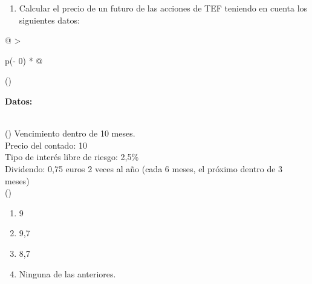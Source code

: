 \documentclass[
  letterpaper,
  DIV=11,
  numbers=noendperiod]{scrreprt}
\providecommand{\tightlist}{%
  \setlength{\itemsep}{0pt}\setlength{\parskip}{0pt}}\usepackage{longtable,booktabs,array}
\begin{document}
\begin{enumerate}
\def\labelenumi{\arabic{enumi}.}
\setcounter{enumi}{57}
\tightlist
\item
  Calcular el precio de un futuro de las acciones de TEF teniendo en
  cuenta los siguientes datos:
\end{enumerate}

\begin{longtable}[]{@{}
  >{\raggedright\arraybackslash}p{(\columnwidth - 0\tabcolsep) * }@{}}
\toprule()
\begin{minipage}[b]{\linewidth}\raggedright
\textbf{Datos:}
\end{minipage} \\
\midrule()
\endhead
Vencimiento dentro de 10 meses. \\
Precio del contado: 10 \\
Tipo de interés libre de riesgo: 2,5\% \\
Dividendo: 0,75 euros 2 veces al año (cada 6 meses, el próximo dentro de
3 meses) \\
\bottomrule()
\end{longtable}

\begin{enumerate}
\def\labelenumi{\alph{enumi})}
\item
  9
\item
  9,7
\item
  8,7
\item
  Ninguna de las anteriores.
\end{enumerate}
\end{document}
